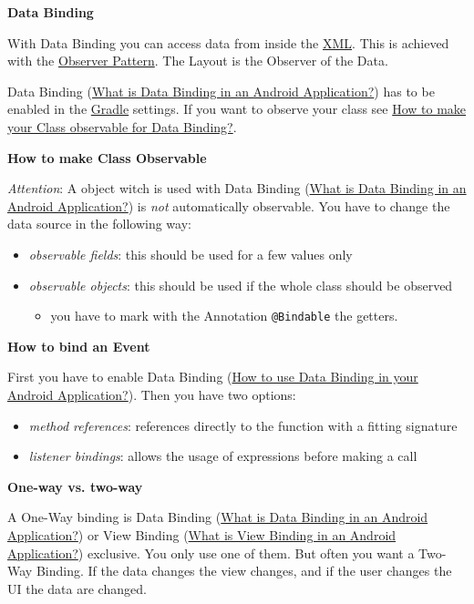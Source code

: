 \documentclass[11pt,twoside,landscape]{article}
\begin{document}
\begin{multicols}{3}
\textbf{Data Binding}

With Data Binding you can access data from inside the \href{../../../roam/20211112100344-xml.org}{XML}.
This is achieved with the \href{../../../roam/20211103140808-observer_pattern.org}{Observer Pattern}.
The Layout is the Observer of the Data.

Data Binding (\href{../../../roam/20211112100504-what_is_data_binding_in_an_android_application.org}{What is Data Binding in an Android Application?}) has to be enabled in the \href{../../../roam/20211112095502-gradle.org}{Gradle} settings.
If you want to observe your class see \href{../../../roam/20211112103257-how_to_make_your_class_observable_for_data_binding.org}{How to make your Class observable for Data Binding?}. 

\textbf{How to make Class Observable}

\emph{Attention}: A object witch is used with Data Binding (\href{../../../roam/20211112100504-what_is_data_binding_in_an_android_application.org}{What is Data Binding in an Android Application?}) is \emph{not} automatically observable.
You have to change the data source in the following way:
\begin{itemize}
\item \emph{observable fields}:  this should be used for a few values only
\item \emph{observable objects}: this should be used if the whole class should be observed
\begin{itemize}
\item you have to mark with the Annotation \texttt{@Bindable} the getters.
\end{itemize}
\end{itemize}


\textbf{How to bind an Event}

First you have to enable Data Binding (\href{../../../roam/20211112101553-how_to_use_data_binding_in_your_android_application.org}{How to use Data Binding in your Android Application?}).
Then you have two options:
\begin{itemize}
\item \emph{method references}: references directly to the function with a fitting signature
\item \emph{listener bindings}: allows the usage of expressions before making a call
\end{itemize}


\textbf{One-way vs. two-way}

A One-Way binding is Data Binding (\href{../../../roam/20211112100504-what_is_data_binding_in_an_android_application.org}{What is Data Binding in an Android Application?}) or View Binding (\href{../../../roam/20211112094953-what_is_view_binding_in_an_android_application.org}{What is View Binding in an Android Application?}) exclusive.
You only use one of them.
But often you want a Two-Way Binding.
If the data changes the view changes, and if the user changes the UI the data are changed.


\end{multicols}
\end{document}

